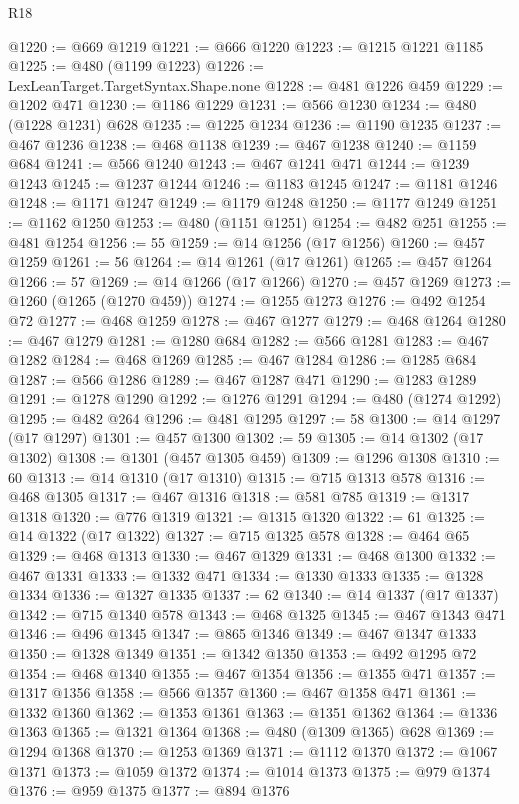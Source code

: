 \begin{lexlean}{R18}
\begin{coremodule}
{{{{{{{{{{{{{{{{{{{{{{{{{{{{{{{{{{{{{{{{{{{{{{{{{{{{{{{{{{{{{{{{{{{{{{{{{{{{{{{{{{{{{{{{{{{{{{{{{{{{{{{{{{{{{@1220 := @669 @1219
@1221 := @666 @1220
@1223 := @1215 @1221 @1185
@1225 := @480 (@1199 @1223)
@1226 := LexLeanTarget.TargetSyntax.Shape.none
@1228 := @481 @1226 @459
@1229 := @1202 @471
@1230 := @1186 @1229
@1231 := @566 @1230
@1234 := @480 (@1228 @1231) @628
@1235 := @1225 @1234
@1236 := @1190 @1235
@1237 := @467 @1236
@1238 := @468 @1138
@1239 := @467 @1238
@1240 := @1159 @684
@1241 := @566 @1240
@1243 := @467 @1241 @471
@1244 := @1239 @1243
@1245 := @1237 @1244
@1246 := @1183 @1245
@1247 := @1181 @1246
@1248 := @1171 @1247
@1249 := @1179 @1248
@1250 := @1177 @1249
@1251 := @1162 @1250
@1253 := @480 (@1151 @1251)
@1254 := @482 @251
@1255 := @481 @1254
@1256 := 55
@1259 := @14 @1256 (@17 @1256)
@1260 := @457 @1259
@1261 := 56
@1264 := @14 @1261 (@17 @1261)
@1265 := @457 @1264
@1266 := 57
@1269 := @14 @1266 (@17 @1266)
@1270 := @457 @1269
@1273 := @1260 (@1265 (@1270 @459))
@1274 := @1255 @1273
@1276 := @492 @1254 @72
@1277 := @468 @1259
@1278 := @467 @1277
@1279 := @468 @1264
@1280 := @467 @1279
@1281 := @1280 @684
@1282 := @566 @1281
@1283 := @467 @1282
@1284 := @468 @1269
@1285 := @467 @1284
@1286 := @1285 @684
@1287 := @566 @1286
@1289 := @467 @1287 @471
@1290 := @1283 @1289
@1291 := @1278 @1290
@1292 := @1276 @1291
@1294 := @480 (@1274 @1292)
@1295 := @482 @264
@1296 := @481 @1295
@1297 := 58
@1300 := @14 @1297 (@17 @1297)
@1301 := @457 @1300
@1302 := 59
@1305 := @14 @1302 (@17 @1302)
@1308 := @1301 (@457 @1305 @459)
@1309 := @1296 @1308
@1310 := 60
@1313 := @14 @1310 (@17 @1310)
@1315 := @715 @1313 @578
@1316 := @468 @1305
@1317 := @467 @1316
@1318 := @581 @785
@1319 := @1317 @1318
@1320 := @776 @1319
@1321 := @1315 @1320
@1322 := 61
@1325 := @14 @1322 (@17 @1322)
@1327 := @715 @1325 @578
@1328 := @464 @65
@1329 := @468 @1313
@1330 := @467 @1329
@1331 := @468 @1300
@1332 := @467 @1331
@1333 := @1332 @471
@1334 := @1330 @1333
@1335 := @1328 @1334
@1336 := @1327 @1335
@1337 := 62
@1340 := @14 @1337 (@17 @1337)
@1342 := @715 @1340 @578
@1343 := @468 @1325
@1345 := @467 @1343 @471
@1346 := @496 @1345
@1347 := @865 @1346
@1349 := @467 @1347 @1333
@1350 := @1328 @1349
@1351 := @1342 @1350
@1353 := @492 @1295 @72
@1354 := @468 @1340
@1355 := @467 @1354
@1356 := @1355 @471
@1357 := @1317 @1356
@1358 := @566 @1357
@1360 := @467 @1358 @471
@1361 := @1332 @1360
@1362 := @1353 @1361
@1363 := @1351 @1362
@1364 := @1336 @1363
@1365 := @1321 @1364
@1368 := @480 (@1309 @1365) @628
@1369 := @1294 @1368
@1370 := @1253 @1369
@1371 := @1112 @1370
@1372 := @1067 @1371
@1373 := @1059 @1372
@1374 := @1014 @1373
@1375 := @979 @1374
@1376 := @959 @1375
@1377 := @894 @1376
}}}}}}}}}}}}}}}}}}}}}}}}}}}}}}}}}}}}}}}}}}}}}}}}}}}}}}}}}}}}}}}}}}}}}}}}}}}}}}}}}}}}}}}}}}}}}}}}}}}}}}}}}}}}}
\end{coremodule}
\end{lexlean}
